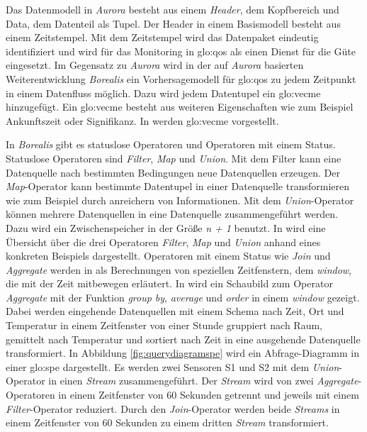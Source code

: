 Das Datenmodell in \textit{Aurora} besteht aus einem \textit{Header}, dem Kopfbereich und Data, dem Datenteil als Tupel. Der Header in einem Basismodell besteht aus einem Zeitstempel. Mit dem Zeitstempel wird das Datenpaket eindeutig identifiziert und wird für das Monitoring in \gls{glo:qos} als einen Dienst für die Güte eingesetzt. Im Gegensatz zu \textit{Aurora} wird in der auf \textit{Aurora} basierten Weiterentwicklung \textit{Borealis} ein Vorhersagemodell für \gls{glo:qos} zu jedem Zeitpunkt in einem Datenfluss möglich. Dazu wird jedem Datentupel ein \gls{glo:vecme} hinzugefügt. Ein \gls{glo:vecme} besteht aus weiteren Eigenschaften wie zum Beispiel Ankunftszeit oder Signifikanz. In  werden \acrlong{glo:vecme} vorgestellt.

In \textit{Borealis} gibt es statuslose Operatoren und Operatoren mit einem Status. Statuslose Operatoren sind \textit{Filter}, \textit{Map} und \textit{Union}. Mit dem Filter kann eine Datenquelle nach bestimmten Bedingungen neue Datenquellen erzeugen. Der \textit{Map}-Operator kann bestimmte Datentupel in einer Datenquelle transformieren wie zum Beispiel durch anreichern von Informationen. Mit dem \textit{Union}-Operator können mehrere Datenquellen in eine Datenquelle zusammengeführt werden. Dazu wird ein Zwischenspeicher in der Größe \textit{n + 1} benutzt. In  wird eine Übersicht über die drei Operatoren \textit{Filter}, \textit{Map} und \textit{Union} anhand eines konkreten Beispiels dargestellt. Operatoren mit einem Status wie \textit{Join} und \textit{Aggregate} werden in \cite[S. 9, Kap. 3.2.2 Stateful Operators]{borealis:programmer} als Berechnungen von speziellen Zeitfenstern, dem \textit{window}, die mit der Zeit mitbewegen erläutert. In \cite[S. 10, Abb. 3.2 Sample output from an aggregate operator]{borealis:programmer} wird ein Schaubild zum Operator \textit{Aggregate} mit der Funktion \textit{group by}, \textit{average} und \textit{order} in einem \textit{window} gezeigt. Dabei werden eingehende Datenquellen mit einem Schema nach Zeit, Ort und Temperatur in einem Zeitfenster von einer Stunde gruppiert nach Raum, gemittelt nach Temperatur und sortiert nach Zeit in eine ausgehende Datenquelle transformiert. In Abbildung \ref{fig:querydiagramspe} wird ein Abfrage-Diagramm in einer \acrlong{glo:spe} dargestellt. Es werden zwei Sensoren S1 und S2 mit dem \textit{Union}-Operator in einen \textit{Stream} zusammengeführt. Der \textit{Stream} wird von zwei \textit{Aggregate}-Operatoren in einem Zeitfenster von 60 Sekunden getrennt und jeweils mit einem \textit{Filter}-Operator reduziert. Durch den \textit{Join}-Operator werden beide \textit{Streams} in einem Zeitfenster von 60 Sekunden zu einem dritten \textit{Stream} transformiert.

